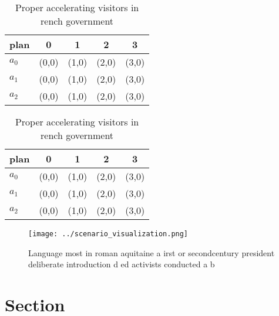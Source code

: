 \documentclass[a4paper]{article}
\begin{document}
\begin{table}
\begin{adjustbox}{width=0.5\columnwidth}
\begin{tabular}{|l|l|l|l|l|}
\hline
\textbf{plan} & \multicolumn{1}{c|}{\textbf{0}} & \multicolumn{1}{c|}{\textbf{1}} & \multicolumn{1}{c|}{\textbf{2}} & \multicolumn{1}{c|}{\textbf{3}} \\ \hline
\textbf{$a_0$}  & (0,0) & (1,0) & (2,0) & (3,0) \\ \hline
\textbf{$a_1$}  & (0,0) & (1,0) & (2,0) & (3,0) \\ \hline
\textbf{$a_2$}  & (0,0) & (1,0) & (2,0) & (3,0) \\ \hline
\end{tabular}
\end{adjustbox}
\caption{Proper accelerating visitors in rench government 
}
\end{table}

\begin{table}
\begin{adjustbox}{width=0.5\columnwidth}
\begin{tabular}{|l|l|l|l|l|}
\hline
\textbf{plan} & \multicolumn{1}{c|}{\textbf{0}} & \multicolumn{1}{c|}{\textbf{1}} & \multicolumn{1}{c|}{\textbf{2}} & \multicolumn{1}{c|}{\textbf{3}} \\ \hline
\textbf{$a_0$}  & (0,0) & (1,0) & (2,0) & (3,0) \\ \hline
\textbf{$a_1$}  & (0,0) & (1,0) & (2,0) & (3,0) \\ \hline
\textbf{$a_2$}  & (0,0) & (1,0) & (2,0) & (3,0) \\ \hline
\end{tabular}
\end{adjustbox}
\caption{Proper accelerating visitors in rench government 
}
\end{table}

\begin{figure}
\centering
\texttt{[image: ../scenario\_visualization.png]}
\caption{Language most in roman aquitaine a irst or secondcentury president deliberate introduction d ed activists conducted a b
}
\end{figure}
 
\section{Section}
\end{document}

